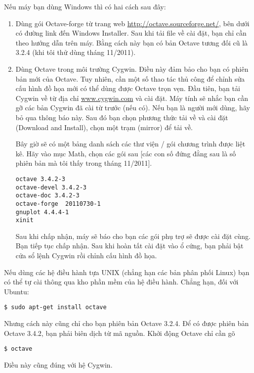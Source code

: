 \documentclass[12pt]{book}
\begin{document}
Nếu máy bạn dùng Windows thì có hai cách sau đây:
\begin{enumerate}

\item Dùng gói Octave-forge từ trang web \url{http://octave.sourceforge.net/},
bên dưới có đường link đến Windows Installer. Sau khi tải file về cài đặt, bạn 
chỉ cần theo hướng dẫn trên máy. 
Bằng cách này bạn có bản Octave tương đối cũ là 3.2.4 (khi tôi thử dùng tháng
11/2011).  

\item Dùng Octave trong môi trường Cygwin. Điều này đảm bảo cho bạn có phiên bản 
mới của Octave. Tuy nhiên, cần một số thao tác thủ công để chỉnh sửa cấu hình
đồ họa mới có thể dùng được Octave trọn vẹn. Đầu tiên, bạn tải Cygwin về từ địa chỉ \url{www.cygwin.com} và 
cài đặt. Máy tính sẽ nhắc bạn cần gỡ các bản Cygwin đã cài từ trước (nếu có). Nếu 
bạn là người mới dùng, hãy bỏ qua thông báo này. Sau đó bạn chọn phương thức 
tải về và cài đặt (Download and Install), chọn một trạm (mirror) để tải về. 

Bây giờ sẽ có một bảng danh sách các thư viện / gói chương trình được liệt kê. 
Hãy vào mục Math, chọn các gói sau [các con số đứng đằng sau là số phiên bản 
mà tôi thấy trong tháng 11/2011].
\begin{verbatim}
octave 3.4.2-3
octave-devel 3.4.2-3
octave-doc 3.4.2-3
octave-forge  20110730-1
gnuplot 4.4.4-1
xinit 
\end{verbatim}
Sau khi chấp nhận, máy sẽ báo cho bạn các gói phụ trợ sẽ được cài đặt cùng. 
Bạn tiếp tục chấp nhận. Sau khi hoàn tất cài đặt vào ổ cứng, bạn phải bật
cửa sổ lệnh Cygwin rồi chỉnh cấu hình đồ họa. 

\end{enumerate}

Nếu dùng các hệ điều hành tựa UNIX (chẳng hạn các bản phân phối Linux) bạn có thể
tự cài thông qua kho phần mềm của hệ điều hành. Chẳng hạn, đối với Ubuntu:
\begin{verbatim}
$ sudo apt-get install octave
\end{verbatim}
Nhưng cách này cũng chỉ cho bạn phiên bản Octave 3.2.4. Để có được phiên bản
Octave 3.4.2, bạn phải biên dịch từ mã nguồn. Khởi động Octave chỉ cần gõ
\begin{verbatim}
$ octave
\end{verbatim}
%
Điều này cũng đúng với hệ Cygwin.
\end{document}
